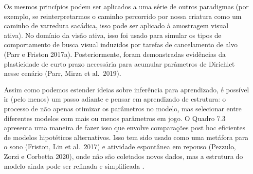 \documentclass[
  12pt,
]{book}
\begin{document}
Os mesmos princípios podem ser aplicados a uma série de outros paradigmas (por exemplo, se reinterpretarmos o caminho percorrido por nossa criatura como um caminho de varredura sacádica, isso pode ser aplicado à amostragem visual ativa). No domínio da visão ativa, isso foi usado para simular os tipos de comportamento de busca visual induzidos por tarefas de cancelamento de alvo (Parr e Friston 2017a). Posteriormente, foram demonstradas evidências da plasticidade de curto prazo necessária para acumular parâmetros de Dirichlet nesse cenário (Parr, Mirza et al.~2019).

Assim como podemos estender ideias sobre inferência para aprendizado, é possível ir (pelo menos) um passo adiante e pensar em aprendizado de estrutura: o processo de não apenas otimizar os parâmetros no modelo, mas selecionar entre diferentes modelos com mais ou menos parâmetros em jogo. O Quadro 7.3 apresenta uma maneira de fazer isso que envolve comparações post hoc eficientes de modelos hipotéticos alternativos. Isso tem sido usado como uma metáfora para o sono (Friston, Lin et al.~2017) e atividade espontânea em repouso (Pezzulo, Zorzi e Corbetta 2020), onde não são coletados novos dados, mas a estrutura do modelo ainda pode ser refinada e simplificada .
\end{document}
